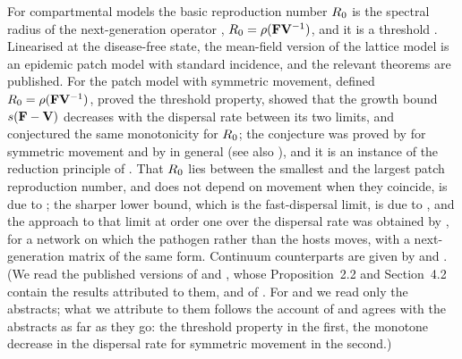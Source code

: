 For compartmental models the basic reproduction number $R_0$ is the spectral radius of the next-generation
operator \citep{diekmann1990definition}, $R_0=\rho(\mathbf{F}\mathbf{V}^{-1})$, and it is a threshold
\citep{vandendriessche2002reproduction}. Linearised at the disease-free state, the mean-field version of the
lattice model is an epidemic patch model with standard incidence, and the relevant theorems are published.
For the patch model with symmetric movement, \citet{allen2007asymptotic} defined $R_0=\rho(\mathbf{F}\mathbf{V}^{-1})$,
proved the threshold property, showed that the growth bound $s(\mathbf{F}-\mathbf{V})$ decreases with the dispersal rate
between its two limits, and conjectured the same monotonicity for $R_0$; the conjecture was proved by
\citet{gao2019travel} for symmetric movement and by \citet{gao2020fast} in general (see also
\citet{chen2020asymptotic}), and it is an instance of the reduction principle of
\citet{altenberg2012resolvent}. That $R_0$ lies between the smallest and the largest patch reproduction
number, and does not depend on movement when they coincide, is due to \citet{gao2011sis}; the sharper lower
bound, which is the fast-dispersal limit, is due to \citet{gao2020fast}, and the approach to that limit at
order one over the dispersal rate was obtained by \citet{tien2015disease}, for a network on which the pathogen
rather than the hosts moves, with a next-generation matrix of the same form. Continuum counterparts are given
by \citet{allen2008asymptotic} and \citet{wang2012basic}. (We read the published versions of
\citet{gao2011sis} and \citet{tien2015disease}, whose Proposition~2.2 and Section~4.2 contain the results
attributed to them, and of \citet{gao2020fast}. For \citet{allen2007asymptotic} and \citet{gao2019travel} we
read only the abstracts; what we attribute to them follows the account of \citet{gao2020fast} and agrees with
the abstracts as far as they go: the threshold property in the first, the monotone decrease in the dispersal
rate for symmetric movement in the second.)

